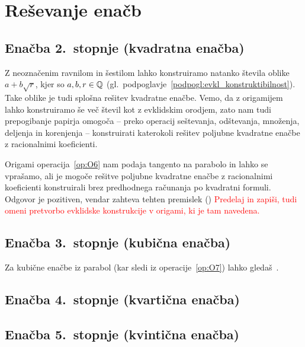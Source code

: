 \section{Reševanje enačb}
\label{pogl:enacbe}



\subsection{Enačba 2.\ stopnje (kvadratna enačba)}

Z neoznačenim ravnilom in šestilom  lahko konstruiramo natanko števila oblike $a + b\sqrt{r}$, kjer so $a, b, r \in \mathbb Q$ (gl.\ podpoglavje~\ref{podpogl:evkl_konstruktibilnost}). Take oblike je tudi splošna rešitev kvadratne enačbe. Vemo, da z origamijem lahko konstruiramo še več števil kot z evklidskim orodjem, zato nam tudi prepogibanje papirja omogoča -- preko operacij seštevanja, odštevanja, množenja, deljenja in korenjenja -- konstruirati katerokoli rešitev poljubne kvadratne enačbe z racionalnimi koeficienti.

Origami operacija~\ref{op:O6} nam podaja tangento na parabolo in lahko se vprašamo, ali je mogoče rešitve poljubne kvadratne enačbe z racionalnimi koeficienti konstruirali brez predhodnega računanja po kvadratni formuli. Odgovor je pozitiven, vendar zahteva tehten premislek (\cite[str.\ 36--38]{hull2020}) \textcolor{red}{Predelaj in zapiši, tudi omeni pretvorbo evklidske konstrukcije v origami, ki je tam navedena.}

\subsection{Enačba 3.\ stopnje (kubična enačba)}

Za kubične enačbe iz parabol (kar sledi iz operacije~\ref{op:O7}) lahko gledaš~\cite[str.\ 150]{geometricconstructions}.

\subsection{Enačba 4.\ stopnje (kvartična enačba)}

\subsection{Enačba 5.\ stopnje (kvintična enačba)}